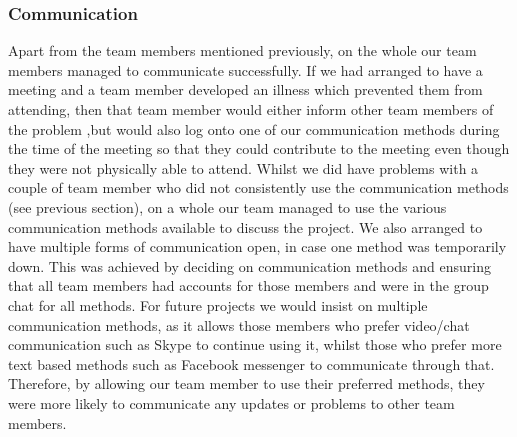 \subsubsection{Communication}
Apart from the team members mentioned previously, on the whole our team members managed to communicate successfully. If we had arranged to have a meeting and a team member developed an illness which prevented them from attending, then that team member would either inform other team members of the problem ,but would also log onto one of our communication methods during the time of the meeting so that they could contribute to the meeting even though they were not physically able to attend. Whilst we did have problems with a couple of team member who did not consistently use the communication methods (see previous section), on a whole our team managed to use the various communication methods available to discuss the project. We also arranged to have multiple forms of communication open, in case one method was temporarily down. This was achieved by deciding on communication methods and ensuring that all team members had accounts for those members and were in the group chat for all methods. For future projects we would insist on multiple communication methods, as it allows those members who prefer video/chat communication such as Skype to continue using it, whilst those who prefer more text based methods such as Facebook messenger to communicate through that. Therefore, by allowing our team member to use their preferred methods, they were more likely to communicate any updates or problems to other team members. 
